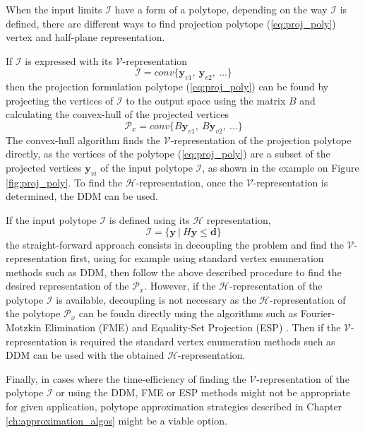 When the input limits $\mathcal{I}$ have a form of a polytope, depending on the way $\mathcal{I}$ is defined, there are different ways to find projection polytope (\ref{eq:proj_poly}) vertex and half-plane representation. 

If $\mathcal{I}$ is expressed with its $\mathcal{V}$-representation
\begin{equation}
    \mathcal{I} = conv\{ \bm{y}_{v1}, ~ \bm{y}_{v2},~ \ldots\}
\end{equation}
then the projection formulation polytope (\ref{eq:proj_poly}) can be found by projecting the vertices of $\mathcal{I}$ to the output space using the matrix $B$ and calculating the convex-hull of the projected vertices
\begin{equation}
    \mathcal{P}_x= conv\{ B\bm{y}_{v1}, ~ B\bm{y}_{v2},~ \ldots\}
\end{equation}
The convex-hull algorithm finds the $\mathcal{V}$-representation of the projection polytope directly, as the vertices of the polytope (\ref{eq:proj_poly}) are a subset of the projected vertices $\bm{y}_{vi}$ of the input polytope $\mathcal{I}$, as shown in the example on Figure \ref{fig:proj_poly}. 
To find the $\mathcal{H}$-representation, once the $\mathcal{V}$-representation is determined, the DDM can be used.

If the input polytope $\mathcal{I}$ is defined using its $\mathcal{H}$ representation, 
\begin{equation}
    \mathcal{I} = \{ \bm{y} ~|~H\bm{y} \leq \bm{d}\}
\end{equation}
the straight-forward approach consists in decoupling the problem and find the $\mathcal{V}$-representation first, using for example using standard vertex enumeration methods such as DDM, then follow the above described procedure to find the desired representation of the $\mathcal{P}_x$. However, if the $\mathcal{H}$-representation of the polytope $\mathcal{I}$ is available, decoupling is not necessary as the $\mathcal{H}$-representation of the polytope $\mathcal{P}_x$ can be foudn directly using the algorithms such as Fourier-Motzkin Elimination (FME) \cite{dantzig1973fourier} and Equality-Set Projection (ESP) \cite{jones2004equality}. Then if the $\mathcal{V}$-representation is required the standard vertex enumeration methods such as DDM can be used with the obtained $\mathcal{H}$-representation.

Finally, in cases where the time-efficiency of finding the $\mathcal{V}$-representation of the polytope $\mathcal{I}$ or using the DDM, FME or ESP methods might not be appropriate for given application, polytope approximation strategies described in Chapter \ref{ch:approximation_algos} might be a viable option.

